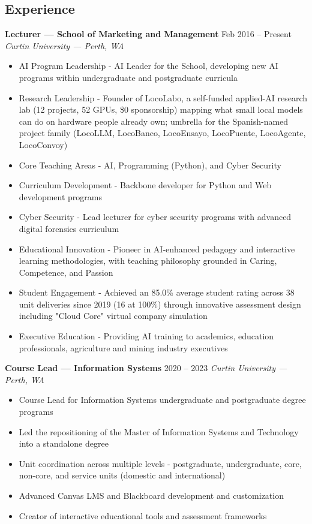 \documentclass[11pt,a4paper]{article}
\begin{document}
\subsection*{Experience}
\textbf{Lecturer — School of Marketing and Management} \hfill Feb 2016 – Present
\textit{Curtin University — Perth, WA}
\begin{itemize}
\item AI Program Leadership - AI Leader for the School, developing new AI programs within undergraduate and postgraduate curricula
\item Research Leadership - Founder of LocoLabo, a self-funded applied-AI research lab (12 projects, 52 GPUs, \$0 sponsorship) mapping what small local models can do on hardware people already own; umbrella for the Spanish-named project family (LocoLLM, LocoBanco, LocoEnsayo, LocoPuente, LocoAgente, LocoConvoy)
\item Core Teaching Areas - AI, Programming (Python), and Cyber Security
\item Curriculum Development - Backbone developer for Python and Web development programs
\item Cyber Security - Lead lecturer for cyber security programs with advanced digital forensics curriculum
\item Educational Innovation - Pioneer in AI-enhanced pedagogy and interactive learning methodologies, with teaching philosophy grounded in Caring, Competence, and Passion
\item Student Engagement - Achieved an 85.0\% average student rating across 38 unit deliveries since 2019 (16 at 100\%) through innovative assessment design including "Cloud Core" virtual company simulation
\item Executive Education - Providing AI training to academics, education professionals, agriculture and mining industry executives
\end{itemize}

\textbf{Course Lead — Information Systems} \hfill 2020 – 2023
\textit{Curtin University — Perth, WA}
\begin{itemize}
\item Course Lead for Information Systems undergraduate and postgraduate degree programs
\item Led the repositioning of the Master of Information Systems and Technology into a standalone degree
\item Unit coordination across multiple levels - postgraduate, undergraduate, core, non-core, and service units (domestic and international)
\item Advanced Canvas LMS and Blackboard development and customization
\item Creator of interactive educational tools and assessment frameworks
\end{itemize}
\end{document}
